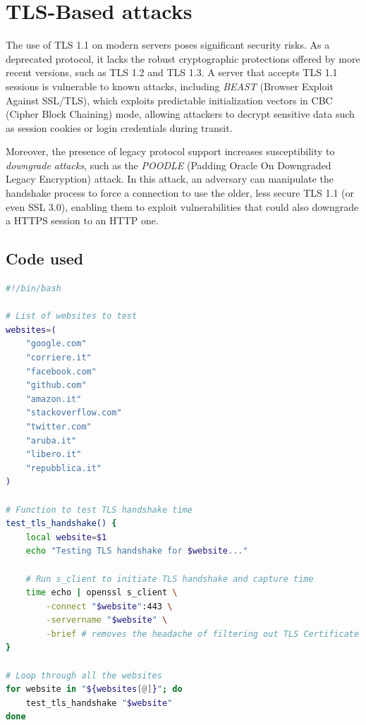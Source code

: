 \documentclass{article}
\begin{document}
\section*{TLS-Based attacks}
The use of TLS 1.1 on modern servers poses significant security risks. As a deprecated protocol, it lacks the robust cryptographic protections offered by more recent versions, such as TLS 1.2 and TLS 1.3. A server that accepts TLS 1.1 sessions is vulnerable to known attacks, including \textit{BEAST} (Browser Exploit Against SSL/TLS), which exploits predictable initialization vectors in CBC (Cipher Block Chaining) mode, allowing attackers to decrypt sensitive data such as session cookies or login credentials during transit. 

Moreover, the presence of legacy protocol support increases susceptibility to \textit{downgrade attacks}, such as the \textit{POODLE} (Padding Oracle On Downgraded Legacy Encryption) attack. In this attack, an adversary can manipulate the handshake process to force a connection to use the older, less secure TLS 1.1 (or even SSL 3.0), enabling them to exploit vulnerabilities that could also downgrade a HTTPS session to an HTTP one.


\newpage

\subsection*{Code used}

\begin{lstlisting}[language=bash]
#!/bin/bash

# List of websites to test
websites=(
    "google.com"
    "corriere.it"
    "facebook.com"
    "github.com"
    "amazon.it"
    "stackoverflow.com"
    "twitter.com"
    "aruba.it"
    "libero.it"
    "repubblica.it"
)

# Function to test TLS handshake time
test_tls_handshake() {
    local website=$1
    echo "Testing TLS handshake for $website..."

    # Run s_client to initiate TLS handshake and capture time
    time echo | openssl s_client \
        -connect "$website":443 \
        -servername "$website" \
        -brief # removes the headache of filtering out TLS Certificate
}

# Loop through all the websites
for website in "${websites[@]}"; do
    test_tls_handshake "$website"
done
\end{lstlisting}\label{code:tls_test}
\end{document}
